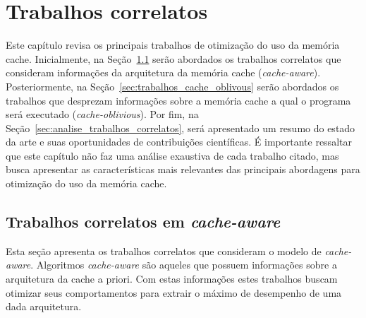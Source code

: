 \chapter{Trabalhos correlatos}
\label{cap:trabalhos_correlatos}

Este capítulo revisa os principais trabalhos de otimização do uso da memória cache.
Inicialmente, na Seção~\ref{sec:trabalhos_cache_aware} serão abordados os trabalhos correlatos que consideram informações da arquitetura da memória cache (\textit{cache-aware}).
Posteriormente, na Seção~\ref{sec:trabalhos_cache_oblivous} serão abordados os trabalhos que desprezam informações sobre a memória cache a qual o programa será executado (\textit{cache-oblivious}).
Por fim, na Seção~\ref{sec:analise_trabalhos_correlatos}, será apresentado um resumo do estado da arte e suas oportunidades de contribuições científicas.
É importante ressaltar que este capítulo não faz uma análise exaustiva de cada trabalho citado, mas busca apresentar as características mais relevantes das principais abordagens para otimização do uso da memória cache.

\section{Trabalhos correlatos em \textit{cache-aware}}
\label{sec:trabalhos_cache_aware}

Esta seção apresenta os trabalhos correlatos que consideram o modelo de \textit{cache-aware}.
Algoritmos \textit{cache-aware} são aqueles que possuem informações sobre a arquitetura da cache a priori.
Com estas informações estes trabalhos buscam otimizar seus comportamentos para extrair o máximo de desempenho de uma dada arquitetura.



